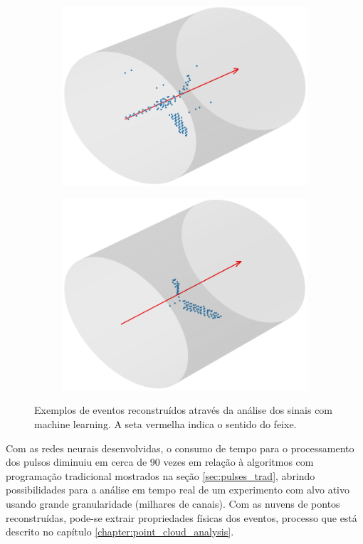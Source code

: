 \documentclass[a4paper,12pt,oneside]{book}
\begin{document}
\begin{figure}[H]
\begin{subfigure}[b]{0.48\textwidth}
        \includegraphics[scale=0.38]{figs/ex_ev_3.png}
        \caption{}
        \label{subfig:ex_ev_3}
    \end{subfigure}%
    \hfill
    \begin{subfigure}[b]{0.48\textwidth}
        \centering
        \includegraphics[scale=0.38]{figs/ex_ev_4.png}
        \caption{}
        \label{subfig:ex_ev_4}
    \end{subfigure}
\caption{Exemplos de eventos reconstruídos através da análise dos sinais com machine learning. A seta vermelha indica o sentido do feixe.}
\label{fig:ex_eventos}
\end{figure}

\par Com as redes neurais desenvolvidas, o consumo de tempo para o processamento dos pulsos diminuiu em cerca de 90 vezes em relação à algoritmos com programação tradicional mostrados na seção \ref{sec:pulses_trad}, abrindo possibilidades para a análise em tempo real de um experimento com alvo ativo usando grande granularidade (milhares de canais). Com as nuvens de pontos reconstruídas, pode-se extrair propriedades físicas dos eventos, processo que está descrito no capítulo \ref{chapter:point_cloud_analysis}.
\end{document}
